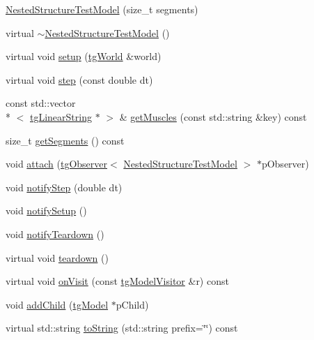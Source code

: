 \begin{DoxyCompactItemize}
\item 
\hyperlink{class_nested_structure_test_model_a0a2ee418c59fbe352c78d9b41bcd587c}{Nested\-Structure\-Test\-Model} (size\-\_\-t segments)
\item 
virtual \hyperlink{class_nested_structure_test_model_acffe04ac1c949ef34141f58c99b59a74}{$\sim$\-Nested\-Structure\-Test\-Model} ()
\item 
virtual void \hyperlink{class_nested_structure_test_model_a97902a2ec224bec01898ff6750358418}{setup} (\hyperlink{classtg_world}{tg\-World} \&world)
\item 
virtual void \hyperlink{class_nested_structure_test_model_a525541e96fd433c3cfc5fc3a574b655e}{step} (const double dt)
\item 
const std\-::vector\\*
$<$ \hyperlink{classtg_linear_string}{tg\-Linear\-String} $\ast$ $>$ \& \hyperlink{class_nested_structure_test_model_afcda0d4badb2b9924e34d942660d265c}{get\-Muscles} (const std\-::string \&key) const 
\item 
size\-\_\-t \hyperlink{class_nested_structure_test_model_a79cfda4f5dfbb9ca55fa05eeb8bf7538}{get\-Segments} () const 
\item 
void \hyperlink{classtg_subject_a56ecfd33a048c3a7f1a884318d9af548}{attach} (\hyperlink{classtg_observer}{tg\-Observer}$<$ \hyperlink{class_nested_structure_test_model}{Nested\-Structure\-Test\-Model} $>$ $\ast$p\-Observer)
\item 
void \hyperlink{classtg_subject_ad9640aa7fcc1e0b4ce8a913a4ce1ea42}{notify\-Step} (double dt)
\item 
void \hyperlink{classtg_subject_a80799e5d0c8512d3d05a55764790392b}{notify\-Setup} ()
\item 
void \hyperlink{classtg_subject_adf7a60dbb0faf0de5528f862e7953e63}{notify\-Teardown} ()
\item 
virtual void \hyperlink{classtg_model_adb5eec1dcf70a8c039850aea144dcc7e}{teardown} ()
\item 
virtual void \hyperlink{classtg_model_aee6457e0fc54d5570b87bfc779f9b1c0}{on\-Visit} (const \hyperlink{classtg_model_visitor}{tg\-Model\-Visitor} \&r) const 
\item 
void \hyperlink{classtg_model_a292c17848b96caee32b2286e44c13f2f}{add\-Child} (\hyperlink{classtg_model}{tg\-Model} $\ast$p\-Child)
\item 
virtual std\-::string \hyperlink{classtg_model_af37b0c1a6d4060bfe0bb9b5038a17725}{to\-String} (std\-::string prefix=\char`\"{}\char`\"{}) const 
\item 

\end{DoxyCompactItemize}
